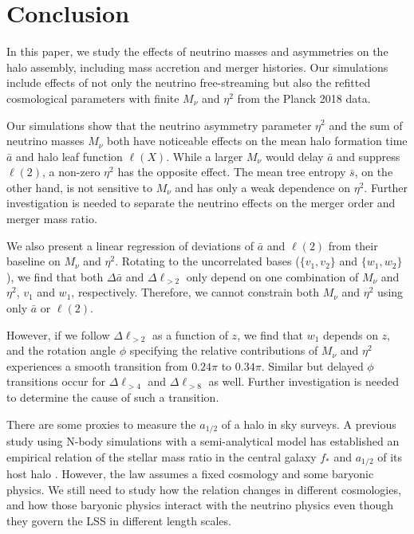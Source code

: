 
\section{Conclusion}
\label{sec:conclusion}
In this paper, we study the effects of neutrino masses and asymmetries on the halo assembly, including mass accretion and merger histories. Our simulations include effects of not only the neutrino free-streaming but also the refitted cosmological parameters with finite $M_\nu$ and $\eta^2$ from the Planck 2018 data.

Our simulations show that the neutrino asymmetry parameter $\eta^2$ and the sum of neutrino masses $M_\nu$ both have noticeable effects on the mean halo formation time $\bar a$ and halo leaf function $\ell(X)$.
While a larger $M_\nu$ would delay $\bar a$ and suppress $\ell(2)$, a non-zero $\eta^2$ has the opposite effect.
The mean tree entropy $\bar s$, on the other hand, is not sensitive to $M_\nu$ and has only a weak dependence on $\eta^2$. Further investigation is needed to separate the neutrino effects on the merger order and merger mass ratio.



We also present a linear regression of deviations of $\bar a$ and  $\ell(2)$ from their baseline on $M_\nu$ and $\eta^2$. Rotating to the uncorrelated bases ($\{v_1, v_2\}$ and $\{w_1, w_2\}$), we find that both $\Delta \bar a$ and $\Delta \ell_{>2}$ only depend on one combination of $M_\nu$ and $\eta^2$, $v_1$ and $w_1$, respectively. Therefore, we cannot constrain both $M_\nu$ and $\eta^2$ using only $\bar {a}$ or $\ell(2)$.


However, if we follow $\Delta \ell_{>2}$ as a function of $z$, we find that $w_1$ depends on $z$, 
and the rotation angle $\phi$ specifying the relative contributions of $M_\nu$ and $\eta^2$ experiences a smooth transition from $0.24\pi$ to $0.34\pi$. 
Similar but delayed $\phi$ transitions occur for $\Delta \ell_{>4}$ and $\Delta \ell_{>8}$ as well.
Further investigation is needed to determine the cause of such a transition.

There are some proxies to measure the $a_{1/2}$ of a halo in sky surveys. A previous study using N-body simulations with a semi-analytical model has established an empirical relation of the stellar mass ratio in the central galaxy $f_*$ and $a_{1/2}$ of its host halo \cite{Lim_2015}. 
However, the law assumes a fixed cosmology and some baryonic physics. We still need to study how the relation changes in different cosmologies, and how those baryonic physics interact with the neutrino physics even though they govern the LSS in different length scales.

